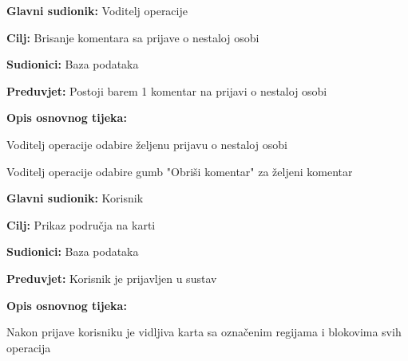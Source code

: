 					\noindent {}
					\begin{packed_item}
	
						\item \textbf{Glavni sudionik: }Voditelj operacije
						\item  \textbf{Cilj:} Brisanje komentara sa prijave o nestaloj osobi
						\item  \textbf{Sudionici:} Baza podataka
						\item  \textbf{Preduvjet:} Postoji barem 1 komentar na prijavi o nestaloj osobi
						\item  \textbf{Opis osnovnog tijeka:}
						
						\item[] \begin{packed_enum}
	
							\item Voditelj operacije odabire željenu prijavu o nestaloj osobi
							\item Voditelj operacije odabire gumb "Obriši komentar" za željeni komentar
							
						\end{packed_enum}
						
					
					\end{packed_item}
					\noindent \underbar{\textbf{UC9 - Prikaz karte}}
					\begin{packed_item}
	
						\item \textbf{Glavni sudionik: }Korisnik
						\item  \textbf{Cilj:} Prikaz područja na karti
						\item  \textbf{Sudionici:} Baza podataka
						\item  \textbf{Preduvjet:} Korisnik je prijavljen u sustav
						\item  \textbf{Opis osnovnog tijeka:}
						
						\item[] \begin{packed_enum}
	
							\item Nakon prijave korisniku je vidljiva karta sa označenim regijama i blokovima svih operacija

						\end{packed_enum}
					\end{packed_item}
					\noindent {}
